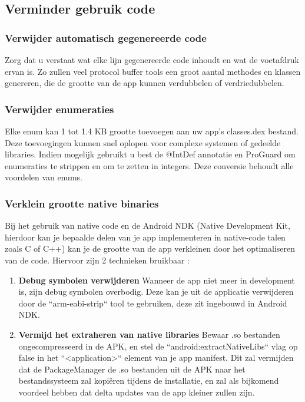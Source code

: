 \subsection{Verminder gebruik code}
\label{sec:reducecode}

\subsubsection{Verwijder automatisch gegenereerde code}
\label{sec:reducegeneratedcode}
Zorg dat u verstaat wat elke lijn gegenereerde code inhoudt en wat de voetafdruk ervan is. Zo zullen veel protocol buffer tools een groot aantal methodes en klassen genereren, die de grootte van de app kunnen verdubbelen of verdriedubbelen.

\subsubsection*{Verwijder enumeraties}
\label{sec:removeenumerations}
Elke enum kan 1 tot 1.4 KB grootte toevoegen aan uw app's classes.dex bestand. Deze toevoegingen kunnen snel oplopen voor complexe systemen of gedeelde libraries. Indien mogelijk gebruikt u best de @IntDef annotatie en ProGuard om enumeraties te strippen en om te zetten in integers. Deze conversie behoudt alle voordelen van enums. 
\subsubsection*{Verklein grootte native binaries}
\label{sec:reducesizenativebinaries}
Bij het gebruik van native code en de Android NDK (Native Development Kit, hierdoor kan je bepaalde delen van je app implementeren in native-code talen zoals C of C++) kan je de grootte van de app verkleinen door het optimaliseren van de code. Hiervoor zijn 2 technieken bruikbaar :
\begin{enumerate}
	\item \textbf{Debug symbolen verwijderen} \newline
	Wanneer de app niet meer in development is, zijn debug symbolen overbodig. Deze kan je uit de applicatie verwijderen door de ``arm-eabi-strip`` tool te gebruiken, deze zit ingebouwd  in Android NDK.
	\item \textbf{Vermijd het extraheren van native libraries} \newline
	Bewaar .so bestanden ongecompresseerd in de APK, en stel de ``android:extractNativeLibs`` vlag op false in het ``<application>`` element van je app manifest. Dit zal vermijden dat de PackageManager de .so bestanden uit de APK naar het bestandssysteem zal kopiëren tijdens de installatie, en zal als bijkomend voordeel hebben dat delta updates van de app kleiner zullen zijn. 
\end{enumerate}

